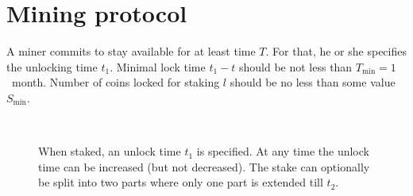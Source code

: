 \documentclass[longbibliography,nofootinbib,twocolumn]{revtex4-1}
\begin{document}
\section{Mining protocol}

A miner commits to stay available for at least time $T$.
For that, he or she specifies the unlocking time $t_1$.
Minimal lock time $t_1 - t$ should be not less than $T_{\min} = 1$~month.
Number of coins locked for staking $l$ should be no less than some value $S_{\min}$.

\begin{figure}
    \\
    \caption{
        When staked, an unlock time $t_1$ is specified.
        At any time the unlock time can be increased (but not decreased).
        The stake can optionally be split into two parts where only one part is extended till $t_2$.
    }
    \label{fig:mining-modes}
\end{figure}
\end{document}
